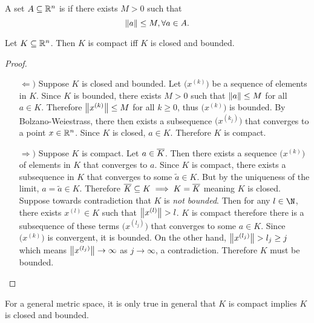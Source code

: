 \documentclass[../main.tex]{subfiles}
\begin{document}
\begin{definition}
    A set $A \subseteq \mathbb{R}^n$ is  if there exists $M > 0$ such that
    \[
        \norm{a} \leq M, \forall a \in A
    .\]
\end{definition}

\begin{theorem}
    Let $K \subseteq \mathbb{R}^n$. Then $K$ is compact iff $K$ is closed and bounded.
\end{theorem}

\begin{proof}
    \begin{enumerate}
        \item[$\Leftarrow)$]
            Suppose $K$ is closed and bounded. Let $\bigl(x^{(k)}\bigr)$ be a sequence of elements in $K$. Since $K$ is bounded, there exists $M > 0$ such that $\norm{a} \leq M$ for all $a \in K$. Therefore $\norm{x^{(k)}} \leq M$ for all $k \geq 0$, thus $\bigl(x^{(k)}\bigr)$ is bounded. By Bolzano-Weiestrass, there then exists a subsequence $\bigl(x^{(k_j)}\bigr)$ that converges to a point $x \in \mathbb{R}^n$. Since $K$ is closed, $a \in K$. Therefore $K$ is compact. \hfill\qedsymbol
        \item[$\Rightarrow)$]
            Suppose $K$ is compact. Let $a \in \overline{K}$. Then there exists a sequence $\bigl(x^{(k)}
            \bigr)$ of elements in $K$ that converges to $a$. Since $K$ is compact, there exists a subsequence in $K$ that converges to some $\tilde{a} \in K$. But by the uniqueness of the limit, $a = \tilde{a} \in K$. Therefore $\overline{K} \subseteq K \implies K = \overline{K}$ meaning $K$ is closed. Suppose towards contradiction that $K$ is \emph{not bounded}. Then for any $l \in \N$, there exists $x^{(l)} \in K$ such that $\norm{x^{(l)}} > l$. $K$ is compact therefore there is a subsequence of these terms $\bigl(x^{(l_j)}\bigr)$ that converges to some $a \in K$. Since $\bigl(x^{(k)}\bigr)$ is convergent, it is bounded. On the other hand, $\norm{x^{(l_j)}} > l_j \geq j$ which means $\norm{x^{(l_j)}} \to \infty$ as $j \to \infty$, a contradiction. Therefore $K$ must be bounded. \qedhere
    \end{enumerate}
\end{proof}

\begin{remark}
    For a general metric space, it is only true in general that $K$ is compact implies $K$ is closed and bounded.
\end{remark}
\end{document}
